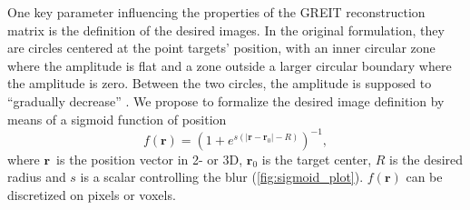 \documentclass[10pt,a4paper]{article}
\newcommand{\rB}{\mbox{$\mathbf{r}$}}
\begin{document}
\begin{multicols}{2}
One key parameter influencing the properties of the GREIT reconstruction matrix 
is the definition of the desired images. In the original formulation, they are 
circles centered at the point targets' position, with an inner circular zone 
where the amplitude is flat and a zone outside a larger circular boundary where 
the amplitude is zero. Between the two circles, the amplitude 
is supposed to ``gradually decrease''  \cite{Adler2009b}.
We propose to formalize the 
desired image definition by means of a sigmoid function of position
\begin{equation}
f(\rB) = \left(1 + e^{s\left(\left|\rB-\rB_0\right| - R\right)}\right)^{-1},
\end{equation}
where \rB\ is the position vector in 2- or 3D, $\rB_0$ is the target 
center, $R$ is the desired radius and $s$ is a scalar controlling the blur  
(\cref{fig:sigmoid_plot}). $f(\rB)$ can be discretized on pixels or voxels. 


\end{multicols}
\end{document}
